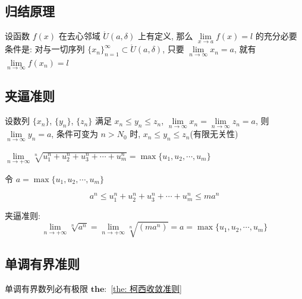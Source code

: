 \subsection{归结原理}
\begin{definition}[归结原理]
	设函数 $f(x)$ 在去心邻域 $\mathring{U}(a,\delta)$ 上有定义, 那么 $\lim\limits_{x\to a}f(x) = l$ 的充分必要条件是: 对与一切序列 $\{x_{n}\}_{n=1}^{\infty}\subset \mathring{U}(a,\delta)$, 只要 $\lim\limits_{n\to\infty}x_{n}=a$, 就有 $\lim\limits_{n\to\infty}f(x_{n})=l$
\end{definition}
\subsection{夹逼准则}
\begin{definition}[夹逼准则]
	设数列 $\{x_{n}\}$, $\{y_{n}\}$, $\{z_{n}\}$ 满足 $x_{n}\leq y_{n}\leq z_{n}$, $\lim\limits_{n\to\infty}x_{n}=\lim\limits_{n\to\infty}z_{n}=a$, 则 $\lim\limits_{n\to\infty}y_{n}=a$, 条件可变为 $n>N_{0}$ 时, $x_{n}\leq y_{n}\leq z_{n}$(有限无关性)
\end{definition}

\begin{corollary}[夹逼准则]
	$\lim\limits_{n\to +\infty}\sqrt[n]{u_{1}^{n}+u_{2}^{n}+u_{3}^{n}+\cdots+u_{m}^{n}}=\max\{ u_{1},u_{2},\cdots,u_{m}\}$
	\begin{anymark}[证明]
		令 $a = \max\{u_{1},u_{2},\cdots,u_{m}\}$

		$$a^{n}\leq u_{1}^{n}+u_{2}^{n}+u_{3}^{n}+\cdots+u_{m}^{n}\leq ma^{n}$$

		夹逼准则:
		$$\lim\limits_{n\to +\infty}\sqrt[n]{a^{n}}=\lim\limits_{n\to +\infty}\sqrt[n]{(ma^{n})} = a =\max\{ u_{1},u_{2},\cdots,u_{m}\}$$
	\end{anymark}
\end{corollary}

\subsection{单调有界准则}
\begin{definition}[单调有界准则]
	单调有界数列必有极限 $\mathbf{the:}$ \ref{the: 柯西收敛准则}
\end{definition}
